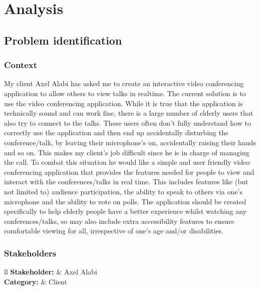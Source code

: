 \pagestyle{fancy}
\chead{\thepage}

\chapter{Analysis}

\section{Problem identification}

\subsection{Context}
\label{sec:1.1.1}

My client Axel Alabi has asked me to create an interactive
video conferencing application to allow others to view talks 
in realtime. The current solution is to use the  
video conferencing application. While it is true that the 
application is technically sound and can work fine, there is a
large number of elderly users that also try to connect to the 
talks. These users often don't fully understand how to 
correctly use the application and then end up accidentally 
disturbing the conference/talk, by leaving their microphone's
on, accidentally raising their hands and so on. This makes my
client's job difficult since he is in charge of managing the 
 call. To combat this situation he would like a 
simple and user friendly video conferencing application that
provides the features needed for people to view and interact
with the conferences/talks in real time. This includes 
features like (but not limited to) audience participation,
the ability to speak to others via one's microphone and the
ability to vote on polls. The application should be
created specifically to help elderly people have a better 
experience whilst watching any conferences/talks, so may also
include extra accessibility features to ensure comfortable
viewing for all, irrespective of one's age and/or disabilities.

\subsection{Stakeholders}

\begin{tblr}{ll}
  \textbf{Stakeholder: } & Axel Alabi\\
  \textbf{Category: } & Client\\
\end{tblr}
\vspace{0.2cm}

